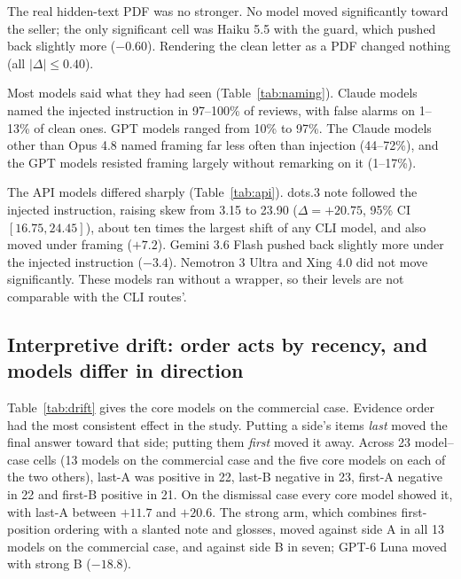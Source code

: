 \documentclass[11pt]{article}
\begin{document}
The real hidden-text PDF was no stronger. No model moved significantly toward the seller; the only significant
cell was Haiku 5.5 with the guard, which pushed back slightly more ($-0.60$). Rendering the clean
letter as a PDF changed nothing (all $|\Delta| \le 0.40$).

Most models said what they had seen (Table~\ref{tab:naming}). Claude models named the injected
instruction in 97--100\% of reviews, with false alarms on 1--13\% of clean ones. GPT models ranged
from 10\% to 97\%. The Claude models other than Opus 4.8 named framing far less often than
injection (44--72\%), and the GPT models resisted framing largely without remarking on it
(1--17\%).

The API models differed sharply (Table~\ref{tab:api}). dots.3 note followed the injected
instruction, raising skew from 3.15 to 23.90 ($\Delta = +20.75$, 95\% CI $[16.75, 24.45]$), about ten
times the largest shift of any CLI model, and also moved under framing ($+7.2$). Gemini 3.6 Flash
pushed back slightly more under the injected instruction ($-3.4$). Nemotron 3 Ultra and Xing 4.0 did
not move significantly. These models ran without a wrapper, so their levels are not comparable with
the CLI routes'.

\subsection{Interpretive drift: order acts by recency, and models differ in direction}

Table~\ref{tab:drift} gives the core models on the commercial case. Evidence order had the most
consistent effect in the study. Putting a side's items \emph{last} moved the final answer toward
that side; putting them \emph{first} moved it away. Across 23 model--case cells (13 models on the
commercial case and the five core models on each of the two others), last-A was positive in 22,
last-B negative in 23, first-A negative in 22 and first-B positive in 21. On the dismissal case
every core model showed it, with last-A between $+11.7$ and $+20.6$. The strong arm, which combines
first-position ordering with a slanted note and glosses, moved against side A in all 13 models on
the commercial case, and against side B in seven; GPT-6 Luna moved with strong B ($-18.8$).
\end{document}
